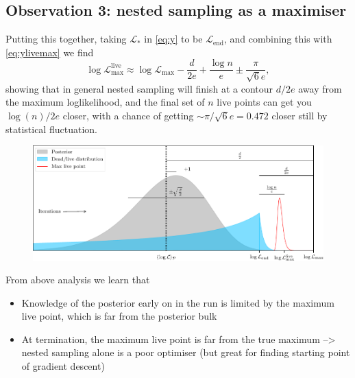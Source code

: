 \documentclass[usenatbib]{mnras}
\begin{document}
\subsection*{Observation 3: nested sampling as a maximiser}
Putting this together, taking $\mathcal{L}_*$ in \cref{eq:y} to be $\mathcal{L}_\mathrm{end}$, and combining this with \cref{eq:ylivemax} we find
\begin{equation}
    \boxed{
        \log{\mathcal{L}}_\mathrm{max}^\mathrm{live} \approx \log\mathcal{L}_\mathrm{max} - \frac{d}{2e} + \frac{\log n}{e} \pm \frac{\pi}{\sqrt{6}e}
    },
\end{equation}
showing that in general nested sampling will finish at a contour $d/2e$ away from the maximum loglikelihood, and the final set of $n$ live points can get you $\log (n)/2e$ closer, with a chance of getting $\sim\pi/\sqrt{6}e=0.472$ closer still by statistical fluctuation.
\begin{figure}
\begin{center}
	\includegraphics{figures/anatomy.pdf}
\end{center}
\caption{}
\label{fig:anatomy}
\end{figure}
\par
From above analysis we learn that
\begin{itemize}
	\item Knowledge of the posterior early on in the run is limited by the maximum live point, which is far from the posterior bulk
	\item At termination, the maximum live point is far from the true maximum --> nested sampling alone is a poor optimiser (but great for finding starting point of gradient descent)
\end{itemize}
\end{document}
